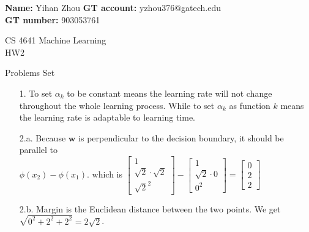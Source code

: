 \documentclass[12pt]{article}
\begin{document}
\textbf{Name:} Yihan Zhou \smallskip  
\textbf{GT account:} yzhou376@gatech.edu\smallskip \\ 
\textbf{GT number:} 903053761\smallskip \\ 

\begin{center}
{
CS 4641  Machine Learning \\
HW2 \\

}

\end{center}

Problems Set

\begin{itemize}



\item[1.] \smallskip To set $\alpha_k$ to be constant means the learning rate will not change throughout the whole learning process. While to set $\alpha_k$ as function $k$ means the learning rate is adaptable to learning time.

\end{itemize}

\begin{itemize}

\item[2.a. ] \smallskip Because $\textbf{w}$ is perpendicular to the decision boundary, it should be parallel to \\  $\phi(x_2) - \phi(x_1)$. which is $
\left[\begin{array}{c} 
1 \\ \sqrt{2} \cdot \sqrt{2} \\ \sqrt{2}^2
\end{array}\right] - 
\left[\begin{array}{c} 
1 \\ \sqrt{2}\cdot0 \\ 0^2
\end{array}\right] 
= 
\left[\begin{array}{c} 
0 \\ 2 \\ 2
\end{array}\right] $  

\end{itemize}

\begin{itemize}

\item[2.b. ] \smallskip Margin is the Euclidean distance between the two points. We get $\sqrt{0^2 + 2^2 + 2^2} = 2\sqrt{2}$.

\end{itemize}
\end{document}
